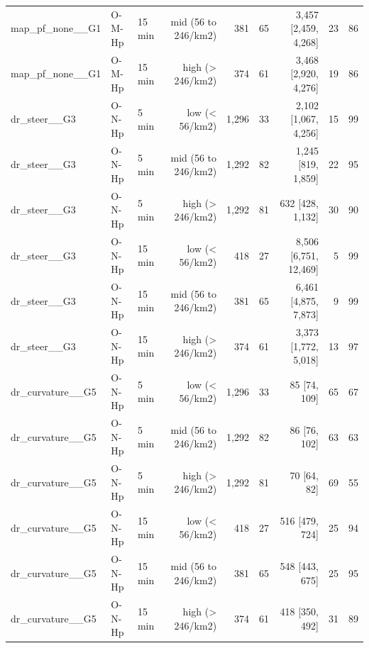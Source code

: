 \begin{table}[t]
\begin{tabular}{lllrrrrrr}
map\_pf\_none\_\_G1 & O-M-Hp & 15 min & mid (56 to 246/km2) & 381 & 65 & 3{,}457 [2{,}459, 4{,}268] & 23 & 86 \\
map\_pf\_none\_\_G1 & O-M-Hp & 15 min & high (> 246/km2) & 374 & 61 & 3{,}468 [2{,}920, 4{,}276] & 19 & 86 \\
dr\_steer\_\_G3 & O-N-Hp & 5 min & low (< 56/km2) & 1{,}296 & 33 & 2{,}102 [1{,}067, 4{,}256] & 15 & 99 \\
dr\_steer\_\_G3 & O-N-Hp & 5 min & mid (56 to 246/km2) & 1{,}292 & 82 & 1{,}245 [819, 1{,}859] & 22 & 95 \\
dr\_steer\_\_G3 & O-N-Hp & 5 min & high (> 246/km2) & 1{,}292 & 81 & 632 [428, 1{,}132] & 30 & 90 \\
dr\_steer\_\_G3 & O-N-Hp & 15 min & low (< 56/km2) & 418 & 27 & 8{,}506 [6{,}751, 12{,}469] & 5 & 99 \\
dr\_steer\_\_G3 & O-N-Hp & 15 min & mid (56 to 246/km2) & 381 & 65 & 6{,}461 [4{,}875, 7{,}873] & 9 & 99 \\
dr\_steer\_\_G3 & O-N-Hp & 15 min & high (> 246/km2) & 374 & 61 & 3{,}373 [1{,}772, 5{,}018] & 13 & 97 \\
dr\_curvature\_\_G5 & O-N-Hp & 5 min & low (< 56/km2) & 1{,}296 & 33 & 85 [74, 109] & 65 & 67 \\
dr\_curvature\_\_G5 & O-N-Hp & 5 min & mid (56 to 246/km2) & 1{,}292 & 82 & 86 [76, 102] & 63 & 63 \\
dr\_curvature\_\_G5 & O-N-Hp & 5 min & high (> 246/km2) & 1{,}292 & 81 & 70 [64, 82] & 69 & 55 \\
dr\_curvature\_\_G5 & O-N-Hp & 15 min & low (< 56/km2) & 418 & 27 & 516 [479, 724] & 25 & 94 \\
dr\_curvature\_\_G5 & O-N-Hp & 15 min & mid (56 to 246/km2) & 381 & 65 & 548 [443, 675] & 25 & 95 \\
dr\_curvature\_\_G5 & O-N-Hp & 15 min & high (> 246/km2) & 374 & 61 & 418 [350, 492] & 31 & 89 \\
\bottomrule\end{tabular}
\end{table}
